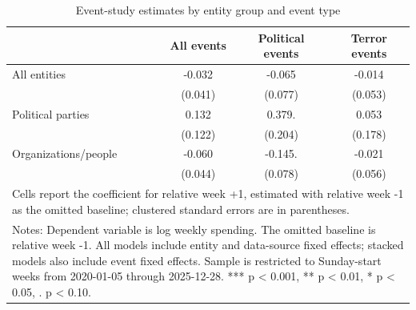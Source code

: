 \begin{table}[!htbp]
\centering
\caption{Event-study estimates by entity group and event type}
\label{tab:event_study_key_results_baseline_minus1}
\begin{tabular}{lccc}
\hline\hline
 & All events & Political events & Terror events \\
\hline
All entities & -0.032 & -0.065 & -0.014 \\
 & (0.041) & (0.077) & (0.053) \\
Political parties & 0.132 & 0.379. & 0.053 \\
 & (0.122) & (0.204) & (0.178) \\
Organizations/people & -0.060 & -0.145. & -0.021 \\
 & (0.044) & (0.078) & (0.056) \\
\hline
\multicolumn{4}{l}{\footnotesize Cells report the coefficient for relative week +1, estimated with relative week -1 as the omitted baseline; clustered standard errors are in parentheses.}\\
\multicolumn{4}{l}{\footnotesize Notes: Dependent variable is log weekly spending. The omitted baseline is relative week -1. All models include entity and data-source fixed effects; stacked models also include event fixed effects. Sample is restricted to Sunday-start weeks from 2020-01-05 through 2025-12-28. *** p < 0.001, ** p < 0.01, * p < 0.05, . p < 0.10.}\\
\hline\hline
\end{tabular}
\end{table}
